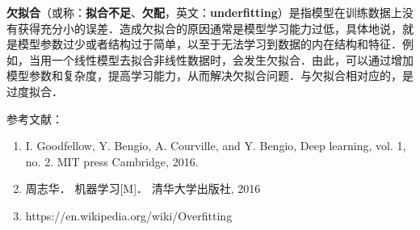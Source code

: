 
\textbf{欠拟合}（或称：\textbf{拟合不足}、\textbf{欠配}，英文：\textbf{underfitting}）是指模型在训练数据上没有获得充分小的误差．造成欠拟合的原因通常是模型学习能力过低，具体地说，就是模型参数过少或者结构过于简单，以至于无法学习到数据的内在结构和特征．例如，当用一个线性模型去拟合非线性数据时，会发生欠拟合．由此，可以通过增加模型参数和复杂度，提高学习能力，从而解决欠拟合问题．与欠拟合相对应的，是过度拟合．



参考文献：
\begin{enumerate}
\item I. Goodfellow, Y. Bengio, A. Courville, and Y. Bengio, Deep learning, vol. 1, no. 2. MIT press Cambridge, 2016.
\item 周志华． 机器学习[M]． 清华大学出版社, 2016
\item https://en.wikipedia.org/wiki/Overfitting
\end{enumerate}